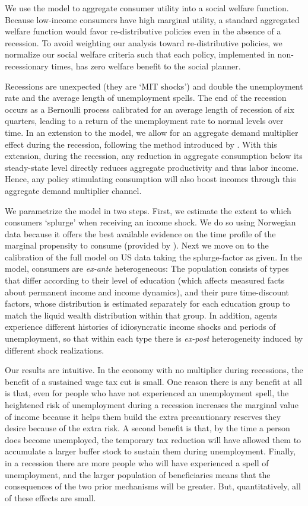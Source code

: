 \documentclass[../HAFiscal]{subfiles}
\begin{document}
We use the model to aggregate consumer utility into a social welfare function. Because low-income consumers have high marginal utility, a standard aggregated welfare function would favor re-distributive policies even in the absence of a recession. To avoid weighting our analysis toward re-distributive policies, we normalize our social welfare criteria such that each policy, implemented in non-recessionary times, has zero welfare benefit to the social planner. 

Recessions are unexpected (they are `MIT shocks') and double the unemployment rate and the average length of unemployment spells. The end of the recession occurs as a Bernoulli process calibrated for an average length of recession of six quarters, leading to a return of the unemployment rate to normal levels over time. In an extension to the model, we allow for an aggregate demand multiplier effect during the recession, following the method introduced by \cite{kmpHandbook2016}. With this extension, during the recession, any reduction in aggregate consumption below its steady-state level directly reduces aggregate productivity and thus labor income. Hence, any policy stimulating consumption will also boost incomes through this aggregate demand multiplier channel.

We parametrize the model in two steps.  First, we estimate the extent to which consumers `splurge' when receiving an income shock. We do so using Norwegian data because it offers the best available evidence on the time profile of the marginal propensity to consume (provided by \cite{fagereng_mpc_2021}). Next we move on to the calibration of the full model on US data taking the splurge-factor as given. In the model, consumers are \textit{ex-ante} heterogeneous: The population consists of types that differ according to their level of education (which affects measured facts about permanent income and income dynamics), and their pure time-discount factors, whose distribution is estimated separately for each education group to match the liquid wealth distribution within that group. In addition, agents experience different histories of idiosyncratic income shocks and periods of unemployment, so that within each type there is \textit{ex-post} heterogeneity induced by different shock realizations. 

Our results are intuitive. In the economy with no multiplier during recessions, the benefit of a sustained wage tax cut is small.  One reason there is any benefit at all is that, even for people who have not experienced an unemployment spell, the heightened risk of unemployment during a recession increases the marginal value of income because it helps them build the extra precautionary reserves they desire because of the extra risk.  A second benefit is that, by the time a person does become unemployed, the temporary tax reduction will have allowed them to accumulate a larger buffer stock to sustain them during unemployment.  Finally, in a recession there are more people who will have experienced a spell of unemployment, and the larger population of beneficiaries means that the consequences of the two prior mechanisms will be greater.  But, quantitatively, all of these effects are small.
\end{document}
